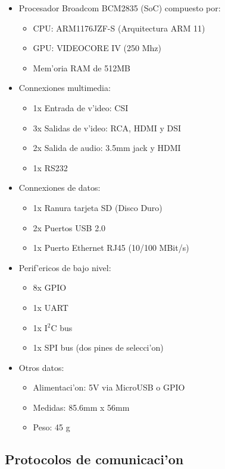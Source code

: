 \documentclass[twoside,12pt]{article}
\begin{document}
\begin{itemize}
\item Procesador Broadcom BCM2835 (SoC) compuesto por:
	\begin{itemize}
	\item CPU: ARM1176JZF-S (Arquitectura ARM 11)
	\item GPU: VIDEOCORE IV (250 Mhz)
	\item Mem'oria RAM de 512MB
	\end{itemize}
\item Connexiones multimedia:
	\begin{itemize}
	\item 1x Entrada de v'ideo: CSI
	\item 3x Salidas de v'ideo: RCA, HDMI y DSI
	\item 2x Salida de audio: 3.5mm jack y HDMI
	\item 1x RS232
	\end{itemize}
\item Connexiones de datos:
	\begin{itemize}
	\item 1x Ranura tarjeta SD (Disco Duro)
	\item 2x Puertos USB 2.0
	\item 1x Puerto Ethernet RJ45 (10/100 MBit/s)
	\end{itemize}
\item Perif'ericos de bajo nivel:
	\begin{itemize}
	\item 8x GPIO
	\item 1x UART
	\item 1x I$^{2}$C bus
	\item 1x SPI bus (dos pines de selecci'on)
	\end{itemize}
\item Otros datos:
	\begin{itemize}
	\item Alimentaci'on: 5V via MicroUSB o GPIO
	\item Medidas: 85.6mm x 56mm
	\item Peso: 45 g
	\end{itemize}
\end{itemize}



\newpage

\subsection{Protocolos de comunicaci'on}
\end{document}

